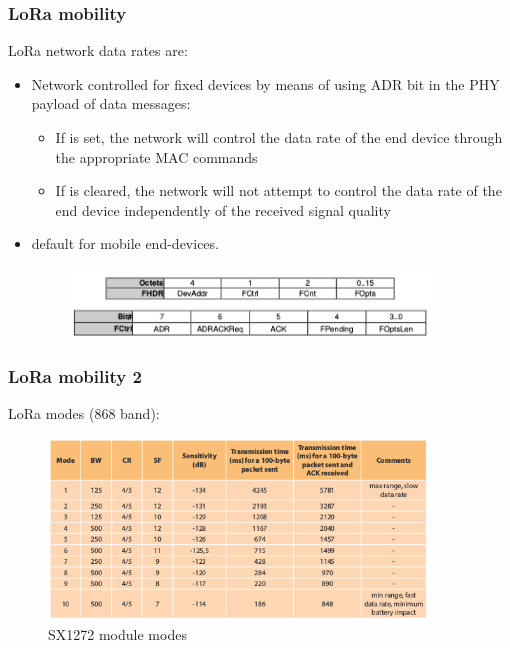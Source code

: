 \begin{frame}[fragile]
  \frametitle{LoRa mobility}
  LoRa network data rates are:
 \begin{itemize}
  \item Network controlled for fixed devices by means of using ADR bit in the PHY payload of data messages:
  \begin{itemize}
    \item If is set, the network will control the data rate of the end device through the appropriate MAC commands
    \item If is cleared, the network will not attempt to control the data rate of the end device independently of the received signal quality
  \end{itemize}
  \item default for mobile end-devices.
\begin{figure}
  \centering
  \includegraphics[width=0.9\textwidth]{img/PHYpayload.png}
  \end{figure}
 \end{itemize}
\end{frame}

\begin{frame}[fragile]
  \frametitle{LoRa mobility 2}
  LoRa modes (868 band):
\begin{figure}
  \centering
  \includegraphics[width=0.9\textwidth]{img/LoRamode.png}
  \caption{SX1272 module modes}
 \end{figure}

\end{frame}


